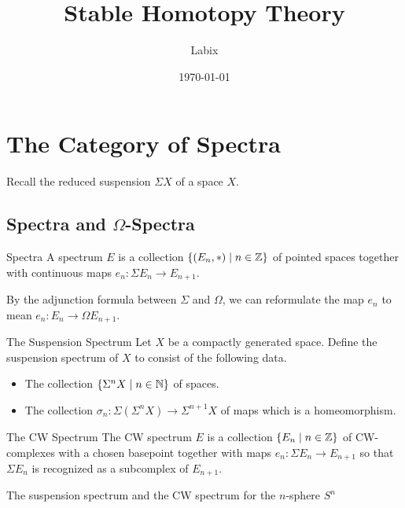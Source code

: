 \documentclass[a4paper]{article}
\title{Stable Homotopy Theory}
\author{Labix}
\date{\today}
\begin{document}
\maketitle
\begin{abstract}
\begin{itemize}
\end{itemize}
\end{abstract}
\pagebreak
\tableofcontents

\pagebreak
\section{The Category of Spectra}
Recall the reduced suspension $\Sigma X$ of a space $X$. 

\subsection{Spectra and $\Omega$-Spectra}
\begin{defn}{Spectra}{} A spectrum $E$ is a collection $\{(E_n,\ast)\;|\;n\in\mathbb{Z}\}$ of pointed spaces together with continuous maps $e_n:\Sigma E_n\to E_{n+1}$. 
\end{defn}

By the adjunction formula between $\Sigma$ and $\Omega$, we can reformulate the map $e_n$ to mean $e_n:E_n\to\Omega E_{n+1}$. 

\begin{defn}{The Suspension Spectrum}{} Let $X$ be a compactly generated space. Define the suspension spectrum of $X$ to consist of the following data. 
\begin{itemize}
\item The collection $\{\Sigma^n X\;|\;n\in\mathbb{N}\}$ of spaces. 
\item The collection $\sigma_n:\Sigma(\Sigma^nX)\to\Sigma^{n+1}X$ of maps which is a homeomorphism. 
\end{itemize}
\end{defn}

\begin{defn}{The CW Spectrum}{} The CW spectrum $E$ is a collection $\{E_n\;|\;n\in\mathbb{Z}\}$ of CW-complexes with a chosen basepoint together with maps $e_n:\Sigma E_n\to E_{n+1}$ so that $\Sigma E_n$ is recognized as a subcomplex of $E_{n+1}$. 
\end{defn}

\begin{lmm}{}{} The suspension spectrum and the CW spectrum for the $n$-sphere $S^n$
\end{lmm}
\end{document}
